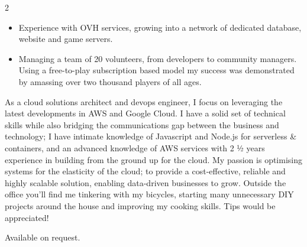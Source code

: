 \documentclass[10pt,a4paper,ragged2e,withhyper]{altacv}
\begin{document}
\begin{paracol}{2}
\divider

\begin{itemize}
\item Experience with OVH services, growing into a network of dedicated database, website and game servers.
\item Managing a team of 20 volunteers, from developers to community managers. Using a free-to-play subscription based model my success was demonstrated by amassing over two thousand players of all ages.
\end{itemize}


\switchcolumn


{As a cloud solutions architect and devops engineer, I focus on leveraging the latest developments in AWS and Google Cloud.}\break\break
{I have a solid set of technical skills while also bridging the communications gap between the business and technology; I have intimate knowledge of Javascript and Node.js for serverless \& containers, and an advanced knowledge of AWS services with 2 ½ years experience in building from the ground up for the cloud.}\break\break
{My passion is optimising systems for the elasticity of the cloud; to provide a cost-effective, reliable and highly scalable solution, enabling data-driven businesses to grow.}\break\break
{Outside the office you'll find me tinkering with my bicycles, starting many unnecessary DIY projects around the house and improving my cooking skills. Tips would be appreciated!}\break



\divider





\divider

\divider


\medskip


{Available on request.}


\end{paracol}
\end{document}
